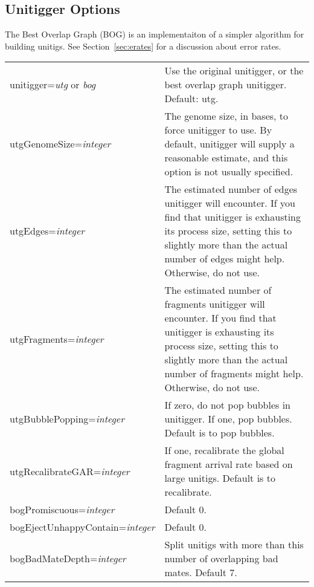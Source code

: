 \documentclass[twoside,11pt]{article}
\begin{document}
\subsection{Unitigger Options}

The Best Overlap Graph (BOG) is an implementaiton of a simpler
algorithm for building unitigs.  See Section~\ref{sec:erates} for
a discussion about error rates.

\begin{longtable}{lp{3.0in}}
unitigger={\em utg} or {\em bog} &
Use the original unitigger, or the best overlap graph unitigger.
Default: utg.
\\

utgGenomeSize={\it integer} &
The genome size, in bases, to force unitigger to use.  By default,
unitigger will supply a reasonable estimate, and this option is not
usually specified.
\\

utgEdges={\it integer} &
The estimated number of edges unitigger will encounter.  If you find
that unitigger is exhausting its process size, setting this to
slightly more than the actual number of edges might help.  Otherwise,
do not use.
\\

utgFragments={\it integer} &
The estimated number of fragments unitigger will encounter.  If you
find that unitigger is exhausting its process size, setting this to
slightly more than the actual number of fragments might help.
Otherwise, do not use.
\\

utgBubblePopping={\it integer} &
If zero, do not pop bubbles in unitigger.  If one, pop bubbles.  Default is to pop bubbles.
\\

utgRecalibrateGAR={\it integer} &
If one, recalibrate the global fragment arrival rate based on large unitigs.  Default is to recalibrate.
\\

bogPromiscuous={\it integer} &
Default 0.
\\

bogEjectUnhappyContain={\it integer} &
Default 0.
\\

bogBadMateDepth={\it integer} &
Split unitigs with more than this number of overlapping bad mates.  Default 7.
\\

\end{longtable}
\end{document}
